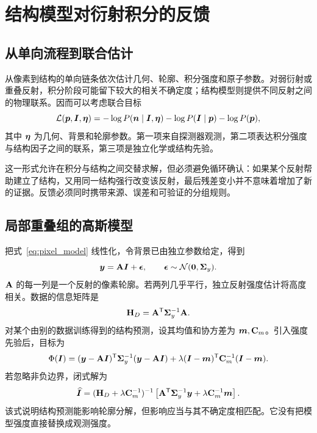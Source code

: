 \chapter{结构模型对衍射积分的反馈}
\section{从单向流程到联合估计}
从像素到结构的单向链条依次估计几何、轮廓、积分强度和原子参数。对弱衍射或重叠反射，积分阶段可能留下较大的相关不确定度；结构模型则提供不同反射之间的物理联系。因而可以考虑联合目标
\begin{equation}
\mathcal L(\bm{p},\bm{I},\bm{\eta})=
-\log P(\bm{n}\mid\bm{I},\bm{\eta})
-\log P(\bm{I}\mid\bm{p})
-\log P(\bm{p}),
\end{equation}
其中 $\bm{\eta}$ 为几何、背景和轮廓参数。第一项来自探测器观测，第二项表达积分强度与结构因子之间的联系，第三项是独立化学或结构先验。

这一形式允许在积分与结构之间交替求解，但必须避免循环确认：如果某个反射帮助建立了结构，又用同一结构强行改变该反射，最后残差变小并不意味着增加了新的证据。反馈必须同时携带来源、误差和可验证的分组规则。

\section{局部重叠组的高斯模型}
把式~\eqref{eq:pixel_model} 线性化，令背景已由独立参数给定，得到
\begin{equation}
\bm{y}=\mathbf{A}\bm{I}+\bm{\epsilon},\qquad
\bm{\epsilon}\sim\mathcal N(\bm{0},\bm{\Sigma}_y).
\end{equation}
$\mathbf{A}$ 的每一列是一个反射的像素轮廓。若两列几乎平行，独立反射强度估计将高度相关。数据的信息矩阵是
\begin{equation}
\mathbf{H}_D=\mathbf{A}^{\mathsf T}\bm{\Sigma}_y^{-1}\mathbf{A}.
\end{equation}
对某个由别的数据训练得到的结构预测，设其均值和协方差为 $\bm{m},\mathbf{C}_m$。引入强度先验后，目标为
\begin{equation}
\Phi(\bm{I})=
(\bm{y}-\mathbf{A}\bm{I})^{\mathsf T}\bm{\Sigma}_y^{-1}(\bm{y}-\mathbf{A}\bm{I})
+\lambda(\bm{I}-\bm{m})^{\mathsf T}\mathbf{C}_m^{-1}(\bm{I}-\bm{m}).
\label{eq:feedback_objective}
\end{equation}
若忽略非负边界，闭式解为
\begin{equation}
\widehat{\bm{I}}=
(\mathbf{H}_D+\lambda\mathbf{C}_m^{-1})^{-1}
\left[\mathbf{A}^{\mathsf T}\bm{\Sigma}_y^{-1}\bm{y}+\lambda\mathbf{C}_m^{-1}\bm{m}\right].
\end{equation}
该式说明结构预测能影响轮廓分解，但影响应当与其不确定度相匹配。它没有把模型强度直接替换成观测强度。

